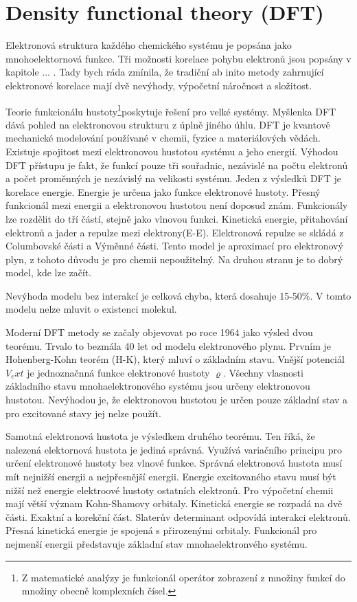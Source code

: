 \documentclass[
  digital, %
  table,   %
  lof,     %
  lot,     %
]{fithesis3}
\begin{document}
\section{Density functional theory (DFT)}
Elektronová struktura každého chemického systému je popsána jako mnohoelektornová funkce. Tři možnosti korelace pohybu elektronů jsou popsány v kapitole ... . Tady bych ráda zmínila, že tradiční ab inito metody zahrnující elektronové korelace mají dvě nevýhody, výpočetní náročnost a složitost.

Teorie funkcionálu hustoty\footnote{Z matematické analýzy je funkcionál operátor zobrazení z množiny funkcí do množiny obecně komplexních čísel.}poskytuje řešení pro velké systémy. Myšlenka DFT dává pohled na elektronovou strukturu z úplně jiného úhlu. DFT je kvantově mechanické modelování používané v chemii, fyzice a materiálových vědách. Existuje spojitost mezi elektronovou hustotou systému a jeho energií.
Výhodou DFT přístupu je fakt, že funkcí pouze tři souřadnic, nezávislé na počtu elektronů a počet proměnných je nezávislý na velikosti systému. Jeden z výsledků DFT je korelace energie. Energie je určena jako funkce elektronové hustoty. Přesný funkcionál mezi energii a elektronovou hustotou není doposud znám. Funkcionály lze rozdělit do tří částí, stejně jako vlnovou funkci. Kinetická energie, přitahování elektronů a jader a repulze mezi elektrony(E-E). Elektronová repulze se skládá z Columbovské části a Výměnné části. Tento model je aproximací pro elektronový plyn, z tohoto důvodu je pro chemii nepoužitelný. Na druhou stranu je to dobrý model, kde lze začít.


Nevýhoda modelu bez interakcí je celková chyba, která dosahuje 15-50\%. V tomto modelu nelze mluvit o existenci molekul.\cite{jensen2007introduction}

Moderní DFT metody se začaly objevovat po roce 1964 jako výsled dvou teorému. Trvalo to bezmála 40 let od modelu elektronového plynu. Prvním je Hohenberg-Kohn teorém (H-K), který mluví o základním stavu. Vnější potenciál  $V_ext$ je jednoznačnná funkce elektronové hustoty $\varrho$. Všechny vlasnosti základního stavu mnohaelektronového systému jsou určeny elektronovou hustotou. Nevýhodou je, že elektronovou hustotou je určen pouze základní stav a pro excitované stavy jej nelze použít.

Samotná elektronová hustota je výsledkem druhého teorému. Ten říká, že nalezená elektornová hustota je jediná správná. Využívá variačního principu pro určení elektronové hustoty bez vlnové funkce. Správná elektronová hustota musí mít nejnižší energii a nejpřesnější energii. Energie excitovaného stavu musí být nižší než energie elektroové hustoty ostatních elektronů. Pro výpočetní chemii mají větší význam Kohn-Shamovy orbitaly. Kinetická energie se rozpadá na dvě části. Exaktní a korekční část. \cite{jensen2007introduction}\cite{koch2000chemist}
Slaterův determinant odpovídá interakci elektronů. Přesná kinetická energie je spojená s přirozenými orbitaly. Funkcionál pro nejmenší energii představuje základní stav mnohaelektronvého systému.
\end{document}
